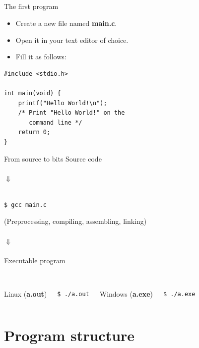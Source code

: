 \subsection{}
\begin{frame}[fragile]{The first program}
	\begin{itemize}
		\item Create a new file named \textbf{main.c}.
		\item Open it in your text editor of choice.
		\item Fill it as follows:
	\end{itemize}
	\begin{lstlisting}
#include <stdio.h>

int main(void) {
	printf("Hello World!\n");
	/* Print "Hello World!" on the
	   command line */
	return 0;
}
\end{lstlisting}
\end{frame}
\begin{frame}[fragile]{From source to bits}
	\centering
	Source code\\\ \\
	$\Downarrow$\\\ \\
	\begin{lstlisting}[numbers=none]
$ gcc main.c
\end{lstlisting}
(Preprocessing, compiling, assembling, linking)
	\ \\\ \\
	$\Downarrow$\\\ \\
	Executable program\\\ \\
	\begin{columns}[T]
		Linux (\textbf{a.out})
		\begin{lstlisting}[numbers=none]
$ ./a.out
\end{lstlisting}
		Windows (\textbf{a.exe})
		\begin{lstlisting}[numbers=none]
$ ./a.exe
\end{lstlisting}
	\end{columns}
\end{frame}
\section{Program structure}
